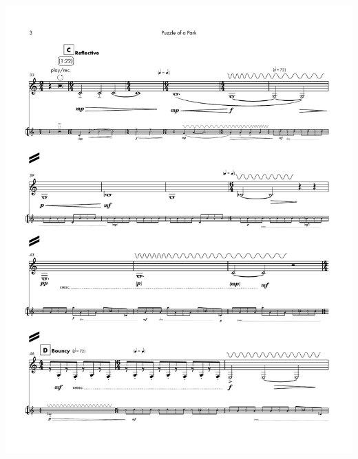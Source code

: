     \begin{center}
    \includegraphics[scale=0.75]{Scores/puzzlePart8.pdf}
    \end{center}
    \newpage

